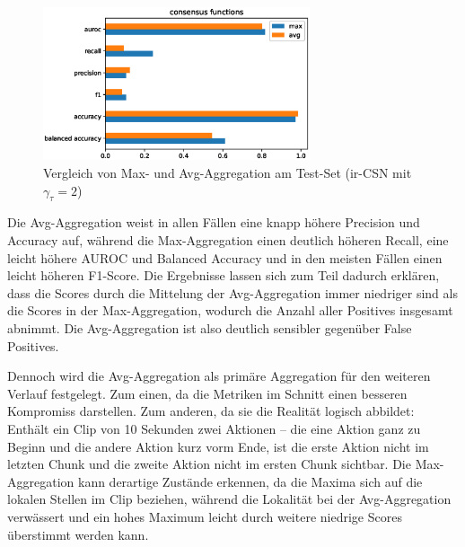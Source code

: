 \begin{figure}[htbp!]
    \centering
    \includegraphics[width=0.7\textwidth, height=0.8\textwidth, keepaspectratio, interpolate]{img/07_consensus.eps}
    \caption{Vergleich von Max- und Avg-Aggregation am Test-Set (ir-CSN mit $\gamma_\tau = 2$) }
    \label{fig:consensus}
\end{figure}

Die Avg-Aggregation weist in allen Fällen eine knapp höhere Precision und Accuracy auf, während die Max-Aggregation einen deutlich höheren Recall, eine leicht höhere AUROC und Balanced Accuracy und in den meisten Fällen einen leicht höheren F1-Score.
Die Ergebnisse lassen sich zum Teil dadurch erklären, dass die Scores durch die Mittelung der Avg-Aggregation immer niedriger sind als die Scores in der Max-Aggregation, wodurch die Anzahl aller Positives insgesamt abnimmt.
Die Avg-Aggregation ist also deutlich sensibler gegenüber False Positives.

Dennoch wird die Avg-Aggregation als primäre Aggregation für den weiteren Verlauf festgelegt.
Zum einen, da die Metriken im Schnitt einen besseren Kompromiss darstellen.
Zum anderen, da sie die Realität logisch abbildet:
Enthält ein Clip von 10 Sekunden zwei Aktionen -- die eine Aktion ganz zu Beginn und die andere Aktion kurz vorm Ende, ist die erste Aktion nicht im letzten Chunk und die zweite Aktion nicht im ersten Chunk sichtbar.
Die Max-Aggregation kann derartige Zustände erkennen, da die Maxima sich auf die lokalen Stellen im Clip beziehen, während die Lokalität bei der Avg-Aggregation verwässert und ein hohes Maximum leicht durch weitere niedrige Scores überstimmt werden kann.

